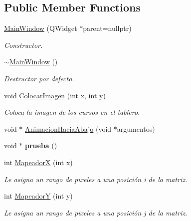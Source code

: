 \subsection*{Public Member Functions}
\begin{DoxyCompactItemize}
\item 
\hyperlink{classMainWindow_a996c5a2b6f77944776856f08ec30858d}{Main\+Window} (Q\+Widget $\ast$parent=nullptr)
\begin{DoxyCompactList}\small\item\em Constructor. \end{DoxyCompactList}\item 
\mbox{\label{classMainWindow_ae98d00a93bc118200eeef9f9bba1dba7}} 
\hyperlink{classMainWindow_ae98d00a93bc118200eeef9f9bba1dba7}{$\sim$\+Main\+Window} ()
\begin{DoxyCompactList}\small\item\em Destructor por defecto. \end{DoxyCompactList}\item 
void \hyperlink{classMainWindow_adaba7b35260aab87d6e59df8cc5d1653}{Colocar\+Imagen} (int x, int y)
\begin{DoxyCompactList}\small\item\em Coloca la imagen de los cursos en el tablero. \end{DoxyCompactList}\item 
void $\ast$ \hyperlink{classMainWindow_abc52e8fdac1541509366c1acd309aa17}{Animacion\+Hacia\+Abajo} (void $\ast$argumentos)
\item 
\mbox{\label{classMainWindow_a8b207ade51b32cc48bdea863839a28ca}} 
void $\ast$ {\bfseries prueba} ()
\item 
int \hyperlink{classMainWindow_ac1039de8ff9cd18a043f2774da95ae08}{MapeadorX} (int x)
\begin{DoxyCompactList}\small\item\em Le asigna un rango de pixeles a una posición i de la matriz. \end{DoxyCompactList}\item 
int \hyperlink{classMainWindow_a7b527f7cf8ab67320613d78c0c1e2bd2}{MapeadorY} (int y)
\begin{DoxyCompactList}\small\item\em Le asigna un rango de pixeles a una posición j de la matriz. \end{DoxyCompactList}\item 

\end{DoxyCompactItemize}
